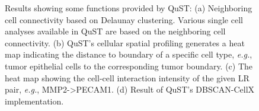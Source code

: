 \documentclass{article}
\begin{document}
\begin{figure}[htp]
{	}
	\caption{Results showing some functions provided by QuST: (a) Neighboring cell connectivity based on Delaunay clustering. Various single cell analyses available in QuST are based on the neighboring cell connectivity.  (b) QuST's cellular spatial profiling generates a heat map indicating the distance to boundary of a specific cell type, \textit{e.g.}, tumor epithelial cells to the corresponding tumor boundary. (c) The heat map showing the cell-cell interaction intensity of the given LR pair, \textit{e.g.}, MMP2->PECAM1. (d) Result of QuST's DBSCAN-CellX implementation.}
	\label{fig:result1}
\end{figure}



\begin{figure}[htp]
	\hfill
	\hfill
	\\

\end{figure}
\end{document}
